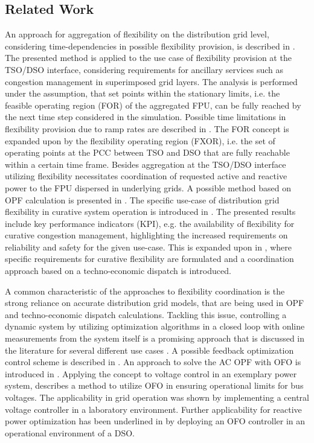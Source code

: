\documentclass[conference,a4paper]{IEEEtran}
\begin{document}
\subsection{Related Work}
An approach for aggregation of flexibility on the distribution grid level, considering time-dependencies in possible flexibility provision, is described in \cite{Contreras_2019}. The presented method is applied to the use case of flexibility provision at the TSO/DSO interface, considering requirements for ancillary services such as congestion management in superimposed grid layers. The analysis is performed under the assumption, that set points within the stationary limits, i.e. the feasible operating region (FOR) of the aggregated FPU, can be fully reached by the next time step considered in the simulation. Possible time limitations in flexibility provision due to ramp rates are described in \cite{Riaz_2019}. The FOR concept is expanded upon by the flexibility operating region (FXOR), i.e. the set of operating points at the PCC between TSO and DSO that are fully reachable within a certain time frame. Besides aggregation at the TSO/DSO interface utilizing flexibility necessitates coordination of requested active and reactive power to the FPU dispersed in underlying grids. A possible method based on OPF calculation is presented in \cite{Frueh_2023}. The specific use-case of distribution grid flexibility in curative system operation is introduced in \cite{Kolster_2020}. The presented results include key performance indicators (KPI), e.g. the availability of flexibility for curative congestion management, highlighting the increased requirements on reliability and safety for the given use-case. This is expanded upon in \cite{Kolster_2022}, where specific requirements for curative flexibility are formulated and a coordination approach based on a techno-economic dispatch is introduced. 

A common characteristic of the approaches to flexibility coordination is the strong reliance on accurate distribution grid models, that are being used in OPF and techno-economic dispatch calculations. Tackling this issue, controlling a dynamic system by utilizing optimization algorithms in a closed loop with online measurements from the system itself is a promising approach that is discussed in the literature for several different use cases \cite{Hau_2021}. A possible feedback optimization control scheme is described in \cite{Härberle_2020}. An approach to solve the AC OPF with OFO is introduced in \cite{Picallo_2023}. Applying the concept to voltage control in an exemplary power system, \cite{Ortmann_2020} describes a method to utilize OFO in ensuring operational limits for bus voltages. The applicability in grid operation was shown by implementing a central voltage controller in a laboratory environment. Further applicability for reactive power optimization has been underlined in \cite{Ortmann_2023} by deploying an OFO controller in an operational environment of a DSO.
\end{document}
